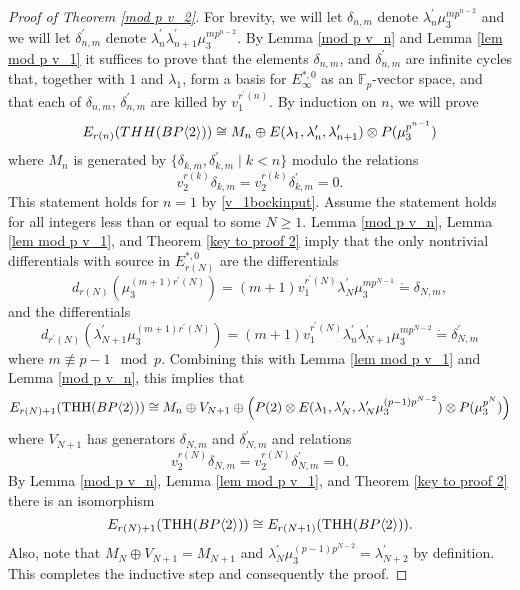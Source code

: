 \begin{proof}[Proof of Theorem \ref{mod p v_2}]
For brevity, we will let $\delta_{n,m}$ denote $\lambda_n^{\prime}\mu_3^{mp^{n-2}}$ and we will let $\delta_{n,m}^{\prime}$ denote $\lambda_n^{\prime}\lambda_{n+1}^{\prime}\mu_3^{mp^{n-2}}$.
By  Lemma \ref{mod p v_n} and Lemma \ref{lem mod p v_1} it suffices to prove that the elements $\delta_{n,m}$, and $\delta_{n,m}^{\prime}$ are infinite cycles that, together with $1$ and $\lambda_1$, form a basis for $E_{\infty}^{*,0}$ as an $\mathbb{F}_p$-vector space, and that each of $\delta_{n,m}$, $\delta_{n,m}^{\prime}$ are killed by $v_1^{r^{\prime}(n)}$. By induction on $n$, we will prove
\[ E_{r(n)}(THH(BP\langle 2 \rangle))\cong M_n\oplus E(\lambda_1,\lambda_n^{\prime},\lambda_{n+1}^{\prime})\otimes P(\mu_3^{p^{n-1}})\]
where $M_n$ is generated by $\{\delta_{k,m}, \delta_{k,m}^{\prime}\mid k<n\}$ modulo the relations 
\[v_2^{r(k)}\delta_{k,m}=v_2^{r(k)}\delta_{k,m}^{\prime}=0. \]
This statement holds for $n=1$ by \eqref{v_1bockinput}. Assume the statement holds for all integers less than or equal to some $N\ge1$. Lemma \ref{mod p v_n}, Lemma \ref{lem mod p v_1}, and Theorem \ref{key to proof 2} imply that the only nontrivial differentials with source in $E_{r(N)}^{*,0}$ are the differentials
\[ d_{r(N)}(\mu_3^{(m+1)r^{\prime}(N)})=(m+1)v_1^{r^{\prime}(N)}\lambda_{N}^{\prime}\mu_3^{mp^{N-1}}\dot{=}\delta_{N,m},\]
and the differentials 
\[ d_{r^{\prime}(N)}(\lambda_{N+1}^{\prime}\mu_3^{(m+1)r^{\prime}(N)})=(m+1)v_1^{r^{\prime}(N)}\lambda_n^{\prime}\lambda_{N+1}^{\prime}\mu_3^{mp^{N-2}}\dot{=}\delta_{N,m}^{\prime}\]
where $m\not \equiv p-1 \mod{p}$. Combining this with Lemma \ref{lem mod p v_1} and Lemma \ref{mod p v_n}, this implies that
\[ E_{r(N)+1}(\operatorname{THH}(BP\langle 2 \rangle))\cong M_n\oplus V_{N+1}\oplus \left ( P(2)\otimes E(\lambda_1, \lambda_{N}^{\prime},\lambda_{N}^{\prime}\mu_3^{(p-1)p^{N-2}} )\otimes P(\mu_3^{p^N})\right )\]
where $V_{N+1}$ has generators $\delta_{N,m}$ and $\delta_{N,m}^{\prime}$ and relations 
\[ v_2^{r(N)}\delta_{N,m}=v_2^{r(N)}\delta_{N,m}^{\prime}=0.\]
By Lemma \ref{mod p v_n}, Lemma \ref{lem mod p v_1}, and Theorem \ref{key to proof 2} there is an isomorphism
\[ E_{r(N)+1}(\operatorname{THH}(BP\langle 2 \rangle))\cong E_{r(N+1)}(\operatorname{THH}(BP\langle 2 \rangle)).\] 
Also, note that $M_N\oplus V_{N+1}=M_{N+1}$ and $\lambda_{N}^{\prime}\mu_3^{(p-1)p^{N-2}}=\lambda_{N+2}^{\prime}$ by definition. This completes the inductive step and consequently the proof.
\end{proof}














 